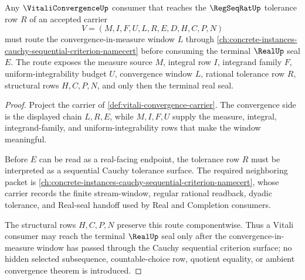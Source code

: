 \begin{theorem}
\label{thm:vitali-convergence-cauchy-sequential-route}
Any $\VitaliConvergenceUp$ consumer that reaches the $\RegSeqRatUp$ tolerance row $R$ of an accepted carrier
$$
V=(M,I,F,U,L,R,E,D,H,C,P,N)
$$
must route the convergence-in-measure window $L$ through \autoref{ch:concrete-instances-cauchy-sequential-criterion-namecert} before consuming the terminal $\RealUp$ seal $E$. The route exposes the measure source $M$, integral row $I$, integrand family $F$, uniform-integrability budget $U$, convergence window $L$, rational tolerance row $R$, structural rows $H,C,P,N$, and only then the terminal real seal.
\end{theorem}
\begin{proof}
Project the carrier of \autoref{def:vitali-convergence-carrier}. The convergence side is the displayed chain $L,R,E$, while $M,I,F,U$ supply the measure, integral, integrand-family, and uniform-integrability rows that make the window meaningful.

Before $E$ can be read as a real-facing endpoint, the tolerance row $R$ must be interpreted as a sequential Cauchy tolerance surface. The required neighboring packet is \autoref{ch:concrete-instances-cauchy-sequential-criterion-namecert}, whose carrier records the finite stream-window, regular rational readback, dyadic tolerance, and Real-seal handoff used by Real and Completion consumers.

The structural rows $H,C,P,N$ preserve this route componentwise. Thus a Vitali consumer may reach the terminal $\RealUp$ seal only after the convergence-in-measure window has passed through the Cauchy sequential criterion surface; no hidden selected subsequence, countable-choice row, quotient equality, or ambient convergence theorem is introduced.
\end{proof}

